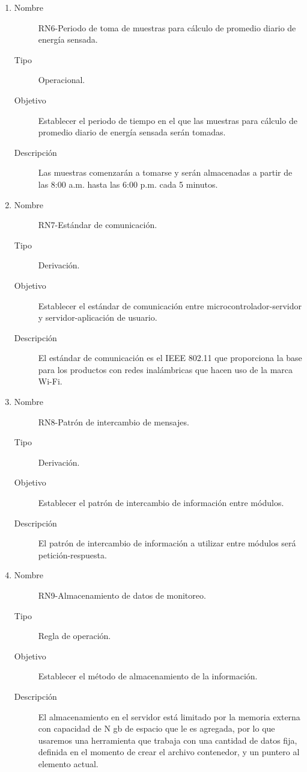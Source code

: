 \begin{enumerate}[label=RN\arabic*.]
\item \label{RN6}
		\begin{description}
			\item[Nombre] RN6-Periodo de toma de muestras para cálculo de promedio diario de energía sensada.
			\item[Tipo] Operacional.
			\item[Objetivo] Establecer el periodo de tiempo en el que las muestras para cálculo de promedio diario de energía sensada serán tomadas.
			\item[Descripción] Las muestras comenzarán a tomarse y serán almacenadas a partir de las 8:00 a.m. hasta las 6:00 p.m. cada 5 minutos.
		\end{description}
		
\item \label{RN7}
		\begin{description}
			\item[Nombre] RN7-Estándar de comunicación.
			\item[Tipo] Derivación.
			\item[Objetivo] Establecer el estándar de comunicación entre microcontrolador-servidor y servidor-aplicación de usuario.
			\item[Descripción] El estándar de comunicación es el IEEE 802.11 que proporciona la base para los productos con redes inalámbricas que hacen uso de la marca Wi-Fi.
		\end{description}
		
\item \label{RN8}
		\begin{description}
			\item[Nombre] RN8-Patrón de intercambio de mensajes.
			\item[Tipo] Derivación.
			\item[Objetivo] Establecer el patrón de intercambio de información entre módulos.
			\item[Descripción] El patrón de intercambio de información a utilizar entre módulos será petición-respuesta.
		\end{description}
		
\item \label{RN9}
		\begin{description}
			\item[Nombre] RN9-Almacenamiento de datos de monitoreo.
			\item[Tipo] Regla de operación.
			\item[Objetivo] Establecer el método de almacenamiento de la información.
			\item[Descripción] El almacenamiento en el servidor está limitado por la memoria externa con capacidad de N gb de espacio que le es agregada, por lo que usaremos una herramienta que trabaja con una cantidad de datos fija, definida en el momento de crear el archivo contenedor, y un puntero al elemento actual.
		\end{description}


\end{enumerate}
